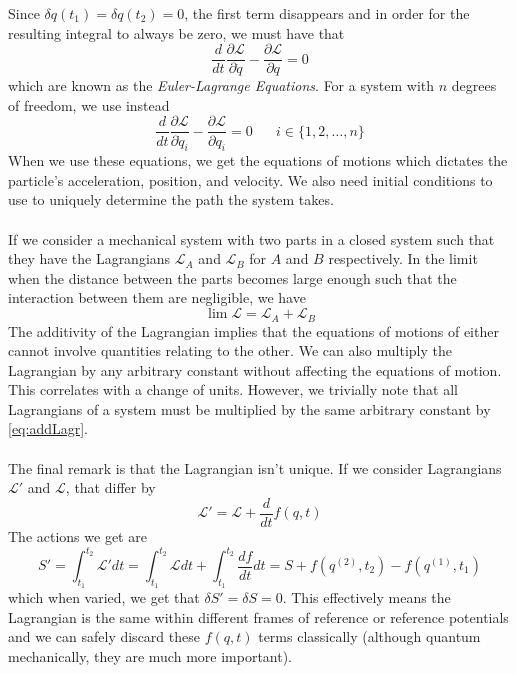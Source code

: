 \documentclass{article}
\newcommand{\pd}[2]{\frac{\partial #1}{\partial #2}}
\newcommand{\od}[2]{\frac{d #1}{d #2}}
\newcommand{\twen}{\hspace{20pt}}
\newcommand{\lagr}{\mathscr{L}}
\theoremstyle{definition}
\theoremstyle{remark}
\begin{document}
Since $\delta q(t_1)=\delta q(t_2)=0$, the first term disappears and in order for the resulting integral to always be zero, we must have that 
\begin{equation}
    \od{}{t} \pd{\lagr}{\dot q} - \pd{\lagr }{q} =0
\end{equation}
which are known as the \emph{Euler-Lagrange Equations}. For a system with $n$ degrees of freedom, we use instead 
\begin{equation}
    \od{}{t} \pd{\lagr}{\dot q_i} - \pd{\lagr }{q_i} =0 \twen i\in \{ 1,2,\ldots,n\}
\end{equation}
When we use these equations, we get the equations of motions which dictates the particle's acceleration, position, and velocity. We also need initial conditions to use to uniquely determine the path the system takes. \\\\
If we consider a mechanical system with two parts in a closed system such that they have the Lagrangians $\lagr_A$ and $\lagr_B$ for $A$ and $B$ respectively. In the limit when the distance between the parts becomes large enough such that the interaction between them are negligible, we have 
\begin{equation}
    \lim \lagr = \lagr_A + \lagr_B \label{eq:addLagr}
\end{equation}
The additivity of the Lagrangian implies that the equations of motions of either cannot involve quantities relating to the other. We can also multiply the Lagrangian by any arbitrary constant without affecting the equations of motion. This correlates with a change of units. However, we trivially note that all Lagrangians of a system must be multiplied by the same arbitrary constant by \eqref{eq:addLagr}. \\\\
The final remark is that the Lagrangian isn't unique. If we consider Lagrangians $\lagr ' $ and $\lagr$, that differ by 
\begin{equation}
    \lagr ' = \lagr + \od{}{t}f(q,t)
\end{equation}
The actions we get are 
\begin{equation*}
    S' = \int^{t_2}_{t_1} \lagr ' dt = \int^{t_2}_{t_1} \lagr dt + \int^{t_2}_{t_1} \od{f}{t} dt = S + f(q^{(2)},t_2) -f(q^{(1)},t_1)
\end{equation*}
which when varied, we get that $\delta S' =\delta S =0$. This effectively means the Lagrangian is the same within different frames of reference or reference potentials and we can safely discard these $f(q,t)$ terms classically (although quantum mechanically, they are much more important).
\end{document}
